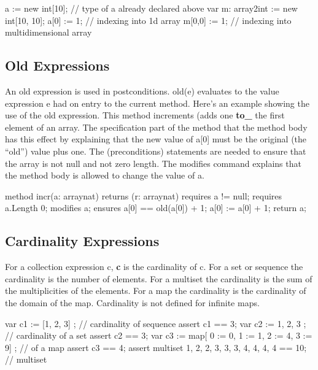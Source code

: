 \documentclass[letterpaper,10pt,english]{sphinxmanual}
\begin{document}
\begin{sphinxVerbatim}[commandchars=\\\{\}]
a := new int[10];       // type of a already declared above
var m: array2\PYGZlt{}int\PYGZgt{} := new int[10, 10];
a[0] := 1;              // indexing into 1\PYGZhy{}d array
m[0,0] := 1;            // indexing into multi\PYGZhy{}dimensional array
\end{sphinxVerbatim}


\subsection{Old Expressions}
\label{\detokenize{06-dafny-language:old-expressions}}
An old expression is used in postconditions. old(e) evaluates to the
value expression e had on entry to the current method.  Here’s an
example showing the use of the old expression.  This method increments
(adds one {\color{red}\bfseries{}to\_} the first element of an array.  The specification part
of the method  that the method body has this effect by
explaining that the new value of a{[}0{]} must be the original (the “old”)
value plus one. The  (preconditions) statements are needed
to ensure that the array is not null and not zero length. The modifies
command explains that the method body is allowed to change the value
of a.

\begin{sphinxVerbatim}[commandchars=\\\{\}]
method incr(a: array\PYGZlt{}nat\PYGZgt{}) returns (r: array\PYGZlt{}nat\PYGZgt{})
requires a != null;
requires a.Length \PYGZgt{} 0;
modifies a;
ensures a[0] == old(a[0]) + 1;
\PYGZob{}
    a[0] := a[0] + 1;
    return a;
\PYGZcb{}
\end{sphinxVerbatim}


\subsection{Cardinality Expressions}
\label{\detokenize{06-dafny-language:cardinality-expressions}}
For a collection expression c, {\color{red}\bfseries{}\textbar{}c\textbar{}} is the cardinality of c. For a set
or sequence the cardinality is the number of elements. For a multiset
the cardinality is the sum of the multiplicities of the elements. For
a map the cardinality is the cardinality of the domain of the
map. Cardinality is not defined for infinite maps.

\begin{sphinxVerbatim}[commandchars=\\\{\}]
var c1 := \textbar{} [1, 2, 3] \textbar{};            // cardinality of sequence
assert c1 == 3;
var c2 := \textbar{} \PYGZob{} 1, 2, 3 \PYGZcb{} \textbar{};          // cardinality of a set
assert c2 == 3;
var c3 := \textbar{} map[ 0 := 0, 1 := 1, 2 := 4, 3 := 9] \textbar{}; // of a map
assert c3 == 4;
assert \textbar{} multiset\PYGZob{} 1, 2, 2, 3, 3, 3, 4, 4, 4, 4 \PYGZcb{} \textbar{} == 10; // multiset
\end{sphinxVerbatim}
\end{document}
